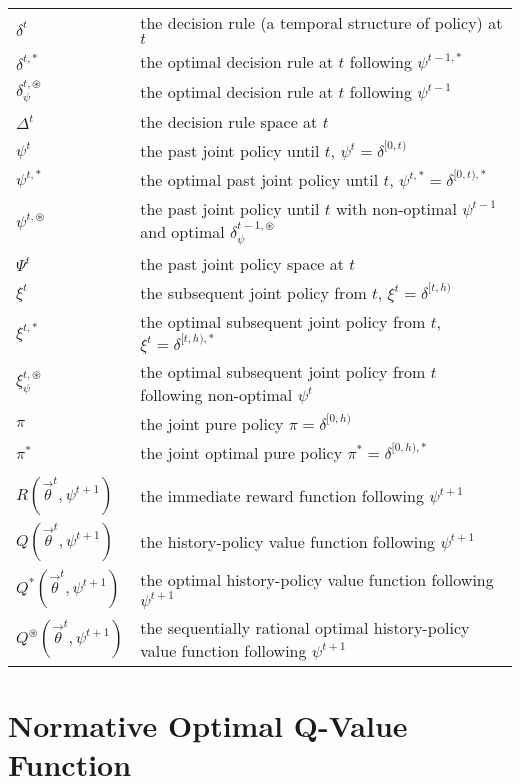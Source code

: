 \documentclass{article} %
\newcommand{\obshist}{\vec{\theta}}
\begin{document}
\begin{table}[h!]
\begin{tabular}{ll}
        $\delta^{t}$ & the decision rule (a temporal structure of policy) at $t$\\ 
        $\delta^{t,*}$ & the optimal decision rule at $t$ following $\psi^{t-1, *}$\\
        $\delta^{t,\circledast}_\psi$ & the optimal decision rule at $t$ following $\psi^{t-1}$\\
        $\Delta^t$ & the decision rule space at $t$\\
        $\psi^{t}$ & the past joint policy until $t$, $\psi^{t} = \delta^{[0, t)}$\\
        $\psi^{t, *}$ & the optimal past joint policy until $t$, $\psi^{t, *} = \delta^{[0, t), *}$\\
        $\psi^{t, \circledast}$ & the past joint policy until $t$ with non-optimal $\psi^{t-1}$ and optimal $\delta^{t-1, \circledast}_\psi$\\
        $\Psi^{t}$ & the past joint policy space at $t$\\
        $\xi^t$ & the subsequent joint policy from $t$, $\xi^{t} = \delta^{[t, h)}$\\
        $\xi^{t, *}$ & the optimal subsequent joint policy from $t$, $\xi^{t} = \delta^{[t, h), *}$\\
        $\xi^{t, \circledast}_\psi$ & the optimal subsequent joint policy from $t$ following non-optimal $\psi^t$\\
        $\pi$ & the joint pure policy $\pi=\delta^{[0, h)}$\\
        $\pi^*$ & the joint optimal pure policy $\pi^*=\delta^{[0, h), *}$\\
        \\

        $R(\obshist^t, \psi^{t+1})$ & the immediate reward function following $\psi^{t+1}$\\
        $Q(\obshist^t, \psi^{t+1})$ & the history-policy value function following $\psi^{t+1}$\\
        $Q^*(\obshist^t, \psi^{t+1})$ & the optimal history-policy value function following $\psi^{t+1}$\\
        $Q^\circledast(\obshist^t, \psi^{t+1})$ & the sequentially rational optimal history-policy value function following $\psi^{t+1}$\\
    \hline \hline
    \end{tabular}
\end{table}
\newpage

\section{Normative Optimal Q-Value Function}
\end{document}
